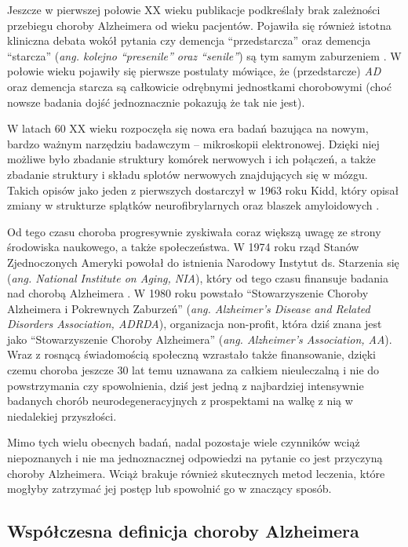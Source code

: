 Jeszcze w pierwszej połowie XX wieku publikacje podkreślały brak zależności przebiegu choroby Alzheimera od wieku pacjentów.
Pojawiła się również istotna kliniczna debata wokół pytania czy demencja ``przedstarcza'' oraz demencja ``starcza'' (\emph{ang. kolejno ``presenile'' oraz ``senile''}) są tym samym zaburzeniem \cite{jellinger2006alzheimer}.
W połowie wieku pojawiły się pierwsze postulaty mówiące, że (przedstarcze) \emph{AD} oraz demencja starcza są całkowicie odrębnymi jednostkami chorobowymi (choć nowsze badania dojść jednoznacznie pokazują że tak nie jest).

W latach 60 XX wieku rozpoczęła się nowa era badań bazująca na nowym, bardzo ważnym narzędziu badawczym -- mikroskopii elektronowej.
Dzięki niej możliwe było zbadanie struktury komórek nerwowych i ich połączeń, a także zbadanie struktury i składu splotów nerwowych znajdujących się w mózgu.
Takich opisów jako jeden z pierwszych dostarczył w 1963 roku Kidd, który opisał zmiany w strukturze splątków neurofibrylarnych oraz blaszek amyloidowych \cite{kidd1963paired}.

Od tego czasu choroba progresywnie zyskiwała coraz większą uwagę ze strony środowiska naukowego, a także społeczeństwa.
W 1974 roku rząd Stanów Zjednoczonych Ameryki powołał do istnienia Narodowy Instytut ds. Starzenia się (\emph{ang. National Institute on Aging, NIA}), który od tego czasu finansuje badania nad chorobą Alzheimera \cite{marx1974aging}.
W 1980 roku powstało ``Stowarzyszenie Choroby Alzheimera i Pokrewnych Zaburzeń'' (\emph{ang. Alzheimer's Disease and Related Disorders Association, ADRDA}), organizacja non-profit, która dziś znana jest jako ``Stowarzyszenie Choroby Alzheimera'' (\emph{ang. Alzheimer's Association, AA}).
Wraz z rosnącą świadomością społeczną wzrastało także finansowanie, dzięki czemu choroba jeszcze 30 lat temu uznawana za całkiem nieuleczalną i nie do powstrzymania czy spowolnienia, dziś jest jedną z najbardziej intensywnie badanych chorób neurodegeneracyjnych z prospektami na walkę z nią w niedalekiej przyszłości.

Mimo tych wielu obecnych badań, nadal pozostaje wiele czynników wciąż niepoznanych i nie ma jednoznacznej odpowiedzi na pytanie co jest przyczyną choroby Alzheimera.
Wciąż brakuje również skutecznych metod leczenia, które mogłyby zatrzymać jej postęp lub spowolnić go w znaczący sposób.

\subsection{Współczesna definicja choroby Alzheimera}

